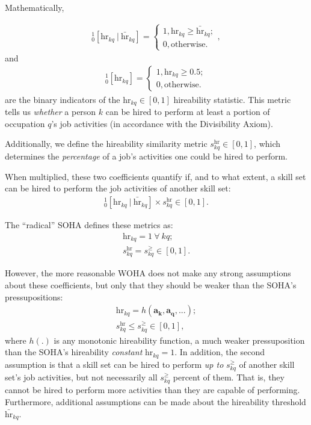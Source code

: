 \documentclass{elsarticle} %
\begin{document}
Mathematically,

\begin{gather}
    _{0}^{1}[\text{hr}_{kq} \ |\ \bar{\text{hr}}_{kq}] =
    \begin{cases}
        1, \text{$\text{hr}_{kq} \geq \bar{\text{hr}}_{kq}$}; \\
        0, \text{otherwise}.
    \end{cases}
    ,
\end{gather}
and
\begin{gather}
    _{0}^{1}[\text{hr}_{kq}] =
    \begin{cases}
        1, \text{$\text{hr}_{kq} \geq 0.5$}; \\
        0, \text{otherwise}.
    \end{cases}
\end{gather}
are the binary indicators of the $\text{hr}_{kq} \in [0,1]$ hireability statistic. This metric tells us \textit{whether} a person $k$ can be hired to perform at least a portion of occupation $q$'s job activities (in accordance with the Divisibility Axiom).

Additionally, we define the hireability similarity metric $s_{kq}^{\text{hr}}
    \in [0,1]$, which determines the \textit{percentage} of a job's activities one
could be hired to perform.

When multiplied, these two coefficients quantify if, and to what extent, a
skill set can be hired to perform the job activities of another skill set:
\begin{gather}
    _{0}^{1}[\text{hr}_{kq} \ |\ \bar{\text{hr}}_{kq}] \times s_{kq}^{\text{hr}}
    \in [0,1]
    .
\end{gather}

The ``radical'' SOHA defines these metrics as:
\begin{gather}
    \text{hr}_{kq} = 1 \ \forall \ kq;\\
    s_{kq}^{\text{hr}} = s_{kq}^{\geq}
    \in [0,1]
    .
\end{gather}

However, the more reasonable WOHA does not make any strong assumptions about
these coefficients, but only that they should be weaker than the SOHA's
pressupositions:
\begin{gather}
    \text{hr}_{kq} = h(\boldsymbol{a_{k}}, \boldsymbol{a_{q}}, ...);\\
    s_{kq}^{\text{hr}} \leq s_{kq}^{\geq}
    \in [0,1]
    ,
\end{gather}
where $h(.)$ is any monotonic hireability function, a much weaker pressuposition than the SOHA's hireability \textit{constant} $\text{hr}_{kq} = 1$. In addition, the second assumption is that a skill set can be hired to perform \textit{up to} $s_{kq}^{\geq}$ of another skill set's job activities, but not necessarily all $s_{kq}^{\geq}$ percent of them. That is, they cannot be hired to perform more activities than they are capable of performing. Furthermore, additional assumptions can be made about the hireability threshold $\bar{\text{hr}}_{kq}$.
\end{document}
